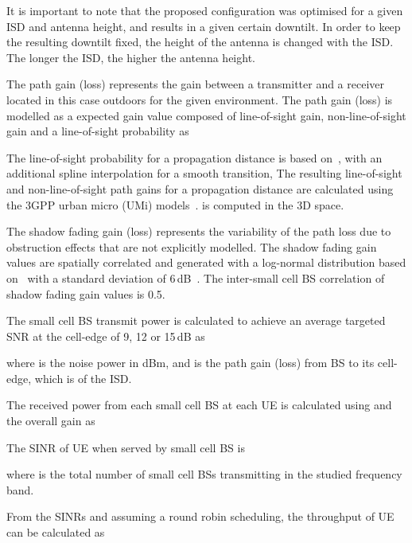 \documentclass{IEEEtran}
\begin{document}
It is important to note that the proposed configuration was optimised for a given \ac{ISD} and antenna height,
and results in a given certain downtilt.
In order to keep the resulting downtilt fixed,
the height of the antenna is changed with the \ac{ISD}.
The longer the \ac{ISD}, the higher the antenna height.

The path gain (loss)  represents the gain between a transmitter and a receiver located in this case outdoors for the given environment.
The path gain (loss) is modelled as a expected gain value composed of line-of-sight gain, non-line-of-sight gain and a line-of-sight probability as











The line-of-sight probability   for a propagation distance  is based on~\cite{TR36.814},
with an additional spline interpolation for a smooth transition,
The resulting line-of-sight  and non-line-of-sight  path gains for a propagation distance 
are calculated using the \ac{3GPP} urban micro (UMi) models~\cite{TR36.814}.
 is computed in the 3D space.



The shadow fading gain (loss)  represents the variability of the path loss due to obstruction effects that are not explicitly modelled.
The shadow fading gain values are spatially correlated and generated with a log-normal distribution based on~\cite{Gudmundson:91, Claussen:05b}
with a standard deviation of 6\,dB~\cite{TR36.814}.
The inter-small cell \ac{BS} correlation of shadow fading gain values is 0.5.


The small cell \ac{BS} transmit power  is calculated to achieve an average targeted \ac{SNR} at the cell-edge of   9, 12 or 15\,dB as

where  is the noise power in dBm,
and  is the path gain (loss) from \ac{BS}  to its cell-edge,
which is  of the \ac{ISD}.




The received power from each small cell \ac{BS}  at each \ac{UE}  is calculated using  and the overall gain  as


The \ac{SINR} of \ac{UE}  when served by small cell \ac{BS}  is

\normalsize
where  is the total number of small cell \acp{BS} transmitting in the studied frequency band.


From the SINRs and assuming a round robin scheduling,
the throughput of \ac{UE}  can be calculated as
\end{document}
